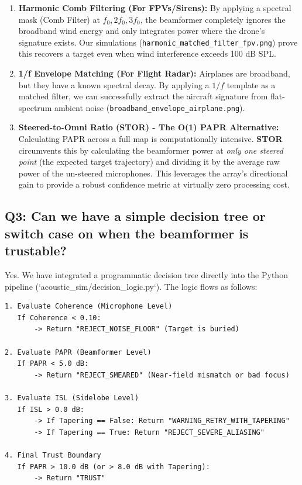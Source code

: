 \documentclass[12pt,letterpaper]{article}
\begin{document}
\begin{enumerate}
    \item \textbf{Harmonic Comb Filtering (For FPVs/Sirens):}
    By applying a spectral mask (Comb Filter) at $f_0, 2f_0, 3f_0$, the beamformer completely ignores the broadband wind energy and only integrates power where the drone's signature exists. Our simulations (\texttt{harmonic\_matched\_filter\_fpv.png}) prove this recovers a target even when wind interference exceeds 100 dB SPL.
    \item \textbf{1/f Envelope Matching (For Flight Radar):}
    Airplanes are broadband, but they have a known spectral decay. By applying a $1/f$ template as a matched filter, we can successfully extract the aircraft signature from flat-spectrum ambient noise (\texttt{broadband\_envelope\_airplane.png}).
    \item \textbf{Steered-to-Omni Ratio (STOR) - The O(1) PAPR Alternative:}
    Calculating PAPR across a full map is computationally intensive. \textbf{STOR} circumvents this by calculating the beamformer power at \textit{only one steered point} (the expected target trajectory) and dividing it by the average raw power of the un-steered microphones. This leverages the array's directional gain to provide a robust confidence metric at virtually zero processing cost.
\end{enumerate}

\subsection*{Q3: Can we have a simple decision tree or switch case on when the beamformer is trustable?}
Yes. We have integrated a programmatic decision tree directly into the Python pipeline (`acoustic_sim/decision_logic.py`). The logic flows as follows:

\begin{verbatim}
1. Evaluate Coherence (Microphone Level)
   If Coherence < 0.10:
       -> Return "REJECT_NOISE_FLOOR" (Target is buried)

2. Evaluate PAPR (Beamformer Level)
   If PAPR < 5.0 dB:
       -> Return "REJECT_SMEARED" (Near-field mismatch or bad focus)

3. Evaluate ISL (Sidelobe Level)
   If ISL > 0.0 dB:
       -> If Tapering == False: Return "WARNING_RETRY_WITH_TAPERING"
       -> If Tapering == True: Return "REJECT_SEVERE_ALIASING"

4. Final Trust Boundary
   If PAPR > 10.0 dB (or > 8.0 dB with Tapering):
       -> Return "TRUST"
\end{verbatim}
\end{document}
